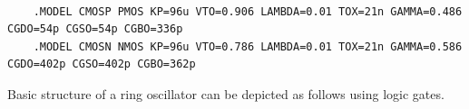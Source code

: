 \documentclass[a4paper,11pt]{article}%
\begin{document}
{\scriptsize
\begin{verbatim}
	
	.MODEL CMOSP PMOS KP=96u VTO=0.906 LAMBDA=0.01 TOX=21n GAMMA=0.486 CGDO=54p CGSO=54p CGBO=336p
	.MODEL CMOSN NMOS KP=96u VTO=0.786 LAMBDA=0.01 TOX=21n GAMMA=0.586 CGDO=402p CGSO=402p CGBO=362p
\end{verbatim}}

\begin{figure}[H]
	\centering
	\hfill
\end{figure}

\pagebreak
Basic structure of a ring oscillator can be depicted as follows using logic gates.
\end{document}
